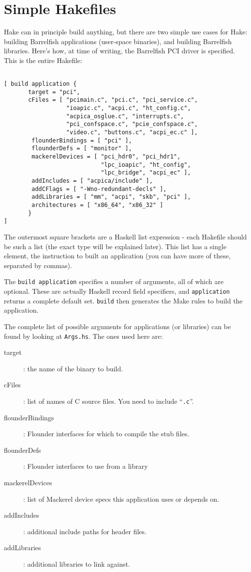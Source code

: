 \documentclass[a4paper,twoside]{report} %
\begin{document}
\chapter{Simple Hakefiles}

Hake can in principle build anything, but there are two simple use
cases for Hake: building Barrelfish applications (user-space
binaries), and building Barrelfish libraries.  Here's how, at time of
writing, the Barrelfish PCI driver is specified.  This is the entire
Hakefile: 

\begin{verbatim}

[ build application { 
       target = "pci",
       cFiles = [ "pcimain.c", "pci.c", "pci_service.c", 
                  "ioapic.c", "acpi.c", "ht_config.c",
                  "acpica_osglue.c", "interrupts.c", 
                  "pci_confspace.c", "pcie_confspace.c",
                  "video.c", "buttons.c", "acpi_ec.c" ],
        flounderBindings = [ "pci" ],
        flounderDefs = [ "monitor" ],
        mackerelDevices = [ "pci_hdr0", "pci_hdr1",
                            "lpc_ioapic", "ht_config",
                            "lpc_bridge", "acpi_ec" ],
        addIncludes = [ "acpica/include" ],
        addCFlags = [ "-Wno-redundant-decls" ],
        addLibraries = [ "mm", "acpi", "skb", "pci" ],
        architectures = [ "x86_64", "x86_32" ]
       }
]
\end{verbatim}

The outermost square brackets are a Haskell list expression - each
Hakefile should be such a list (the exact type will be explained
later).   This list has a single element, the instruction to built an
application (you can have more of these, separated by commas). 

The \texttt{build application} specifies a number of arguments, all of
which are optional.  These are actually Haskell record field
specifiers, and \texttt{application} returns a complete default set.
\texttt{build} then generates the Make rules to build the
application. 

The complete list of possible arguments for applications (or
libraries) can be found by looking at \texttt{Args.hs}.  The ones used
here are:
\begin{description}
\item[target]: the name of the binary to build.  
\item[cFiles]: list of names of C source files. You need to include
  ``\texttt{.c}''. 
\item[flounderBindings]: Flounder interfaces for which to compile 
  the stub files.  
\item[flounderDefs]: Flounder interfaces to use from a library
\item[mackerelDevices]: list of Mackerel device specs this application uses or depends on. 
\item[addIncludes]: additional include paths for header files. 
\item[addLibraries]: additional libraries to link against.
\end{description}
\end{document}
